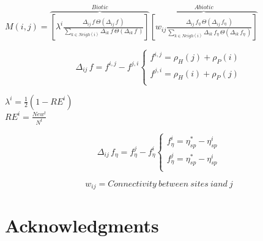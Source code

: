 \documentclass[10pt]{article}
\begin{document}
\vspace{0.25cm}
\small{$M(i,j) = \overbrace{ \left[ \lambda^{i} \frac{ \Delta_{ij}\,f\,\Theta \left(\Delta_{ij}\,f\,\right) }{ \sum_{k \in Neigh\left(i\right)}\Delta_{ik}\,f\,\Theta \left(\Delta_{ik}\,f\,\right) }\right]}^{Biotic} \overbrace{\left[w_{ij} \frac{ \Delta_{ij}\,f_{\eta}\,\Theta \left(\Delta_{ij}\,f_{\eta}\,\right) }{ \sum_{k \in Neigh\left(i\right)}\Delta_{ik}\,f_{\eta}\,\Theta \left(\Delta_{ik}\,f_{\eta}\,\right) }\right]}^{Abiotic}$}

\vspace{0.5cm}
$$
\Delta_{ij}\,f = f^{i,j} - f^{j,i}\left\{ \begin{array}{rl}
 f^{i,j} = \rho_{H}(j) + \rho_{P}(i) \\
 f^{j,i} = \rho_{H}(i) + \rho_{P}(j) \\
       \end{array} \right.
$$

\vspace{0.5cm}
\centering $\lambda^{i} = \frac{1}{2} \left( 1 - RE^{i} \right)$ \\

\vspace{0.25cm}
\centering $ RE^{i} = \frac{ New^{t} }{ N^{t} }$

\vspace{0.25cm}
$$
 \Delta_{ij}\,f_{\eta} = f_{\eta}^{j} - f_{\eta}^{i} \left\{ \begin{array}{rl}
 f_{\eta}^{i} = \eta_{sp}^{*} - \eta_{sp}^{i} \\
 f_{\eta}^{j} = \eta_{sp}^{*} - \eta_{sp}^{i} \\
       \end{array} \right.
$$

\vspace{0.25cm}
$$w_{ij} = Connectivity \: between \: sites \: i and \: j$$


\vspace{1cm}
\section*{Acknowledgments}



\end{document}
